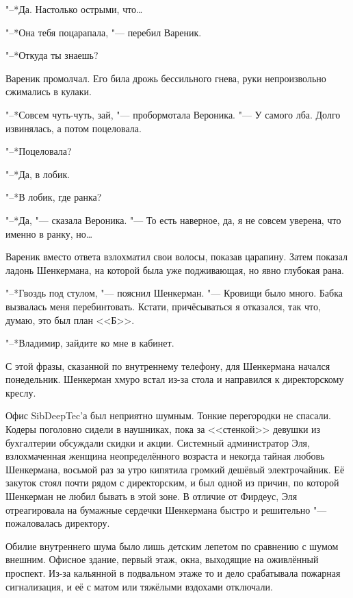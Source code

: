 "--*Да.
Настолько острыми, что\ldots{}

"--*Она тебя поцарапала, "--- перебил Вареник.

"--*Откуда ты знаешь?

Вареник промолчал.
Его била дрожь бессильного гнева, руки непроизвольно сжимались в кулаки.

"--*Совсем чуть-чуть, зай, "--- пробормотала Вероника.
"--- У самого лба.
Долго извинялась, а потом поцеловала.

"--*Поцеловала?

"--*Да, в лобик.

"--*В лобик, где ранка?

"--*Да, "--- сказала Вероника.
"--- То есть наверное, да, я не совсем уверена, что именно в ранку, но\ldots{}

Вареник вместо ответа взлохматил свои волосы, показав царапину.
Затем показал ладонь Шенкермана, на которой была уже подживающая, но явно глубокая рана.

"--*Гвоздь под стулом, "--- пояснил Шенкерман.
"--- Кровищи было много.
Бабка вызвалась меня перебинтовать.
Кстати, причёсываться я отказался, так что, думаю, это был план <<Б>>.

\asterism

\label{Mon_2012_07_09}

"--*Владимир, зайдите ко мне в кабинет.

С этой фразы, сказанной по внутреннему телефону, для Шенкермана начался понедельник.
Шенкерман хмуро встал из-за стола и направился к директорскому креслу.

Офис SibDeepTec'а был неприятно шумным.
Тонкие перегородки не спасали.
Кодеры поголовно сидели в наушниках, пока за <<стенкой>> девушки из бухгалтерии обсуждали скидки и акции.
Системный администратор Эля, взлохмаченная женщина неопределённого возраста и некогда тайная любовь Шенкермана, восьмой раз за утро кипятила громкий дешёвый электрочайник.
Её закуток стоял почти рядом с директорским, и был одной из причин, по которой Шенкерман не любил бывать в этой зоне.
В отличие от Фирдеус, Эля отреагировала на бумажные сердечки Шенкермана быстро и решительно "--- пожаловалась директору.

Обилие внутреннего шума было лишь детским лепетом по сравнению с шумом внешним.
Офисное здание, первый этаж, окна, выходящие на оживлённый проспект.
Из-за кальянной в подвальном этаже то и дело срабатывала пожарная сигнализация, и её с матом или тяжёлыми вздохами отключали.

